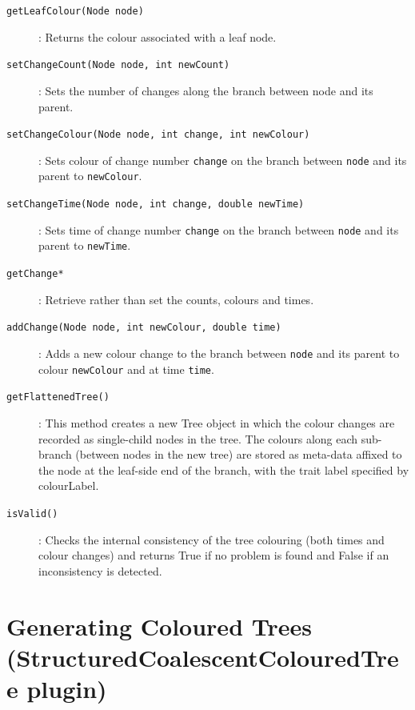 \documentclass[a4paper,11pt]{paper}
\newcommand{\class}[1]{\textsf{#1}}
\newcommand{\inp}[1]{\textsf{\color{blue}#1}}
\newcommand{\code}[1]{\texttt{#1}}
\begin{document}
\begin{description}
	\item[\code{getLeafColour(Node node)}]: Returns the colour
		associated with a leaf node.

	\item[\code{setChangeCount(Node node, int newCount)}]: Sets the
			number of changes along the branch between node and its
			parent.

	\item[\code{setChangeColour(Node node, int change, int
		newColour)}]: Sets colour of change number \code{change} on the branch
		between \code{node} and its parent to \code{newColour}.
	

	\item[\code{setChangeTime(Node node, int change, double newTime)}]:
		Sets time of change number \code{change} on the
		branch between \code{node} and its parent to \code{newTime}.
	
	\item[\code{getChange*}]: Retrieve rather than set the counts,
		colours and times.

	\item[\code{addChange(Node node, int newColour, double time)}]:
		Adds a new colour change to the branch between \code{node} and
		its parent to colour \code{newColour} and at time \code{time}.

	\item[\code{getFlattenedTree()}]: This method creates a new
		\class{Tree} object in which the colour changes are recorded
		as single-child nodes in the tree. The colours along each
		sub-branch (between nodes in the new tree) are stored as
		meta-data affixed to the node at the leaf-side end of the
		branch, with the trait label specified by \inp{colourLabel}.

	\item[\code{isValid()}]: Checks the internal consistency of the tree
		colouring (both times and colour changes) and returns True if
		no problem is found and False if an inconsistency is detected.

\end{description}


\section{Generating Coloured Trees (StructuredCoalescentColouredTree plugin)}
\end{document}
